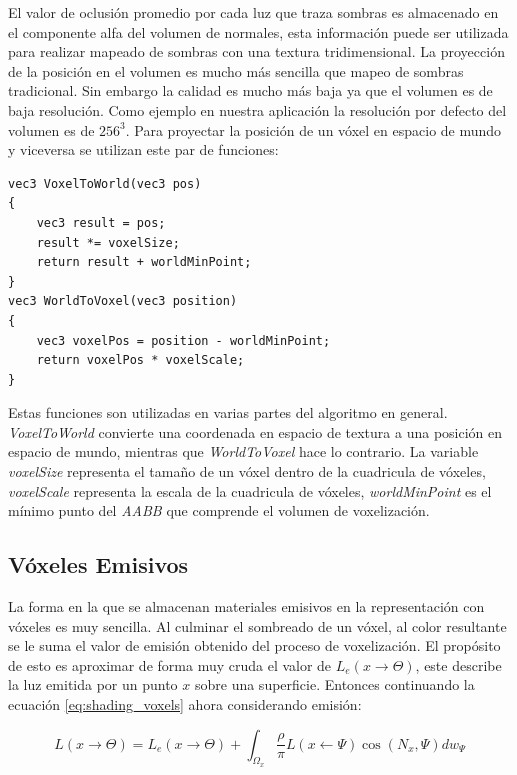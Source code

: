 El valor de oclusión promedio por cada luz que traza sombras es almacenado en el componente alfa del volumen de normales, esta información puede ser utilizada para realizar mapeado de sombras con una textura tridimensional. La proyección de la posición en el volumen es mucho más sencilla que mapeo de sombras tradicional. Sin embargo la calidad es mucho más baja ya que el volumen es de baja resolución. Como ejemplo en nuestra aplicación la resolución por defecto del volumen es de $256^3$. Para proyectar la posición de un vóxel en espacio de mundo y viceversa se utilizan este par de funciones:
\\
\begin{lstlisting}[caption={Transformación de espacio entre coordenadas de textura y posiciones de mundo.}, label=SpaceTransform]
vec3 VoxelToWorld(vec3 pos)
{
	vec3 result = pos;
	result *= voxelSize;
	return result + worldMinPoint;
}
vec3 WorldToVoxel(vec3 position)
{
    vec3 voxelPos = position - worldMinPoint;
    return voxelPos * voxelScale;
}
\end{lstlisting}

Estas funciones son utilizadas en varias partes del algoritmo en general. \emph{VoxelToWorld} convierte una coordenada en espacio de textura a una posición en espacio de mundo, mientras que \emph{WorldToVoxel} hace lo contrario. La variable \emph{voxelSize} representa el tamaño de un vóxel dentro de la cuadricula de vóxeles, \emph{voxelScale} representa la escala de la cuadricula de vóxeles, \emph{worldMinPoint} es el mínimo punto del \emph{AABB} que comprende el volumen de voxelización.

\subsection{Vóxeles Emisivos}
La forma en la que se almacenan materiales emisivos en la representación con vóxeles es muy sencilla. Al culminar el sombreado de un vóxel, al color resultante se le suma el valor de emisión obtenido del proceso de voxelización. El propósito de esto es aproximar de forma muy cruda el valor de $L_e(x\to\Theta)$, este describe la luz emitida por un punto $x$ sobre una superficie. Entonces continuando la ecuación \ref{eq:shading_voxels} ahora considerando emisión:

\begin{equation}
		L(x\to\Theta) = L_e(x\to\Theta) + \int_{\Omega_{x}}{\frac{\rho}{\pi}L(x\gets\Psi)\cos(N_{x}, \Psi)dw_{\Psi}}
\end{equation}


